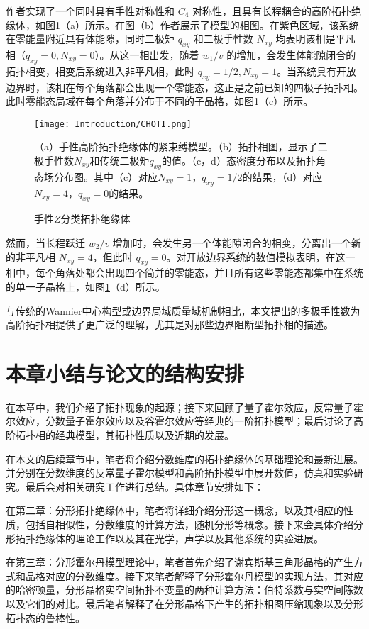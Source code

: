 作者实现了一个同时具有手性对称性和 \( C_4 \) 对称性，且具有长程耦合的高阶拓扑绝缘体，如图\ref{fig:CHOTI}（a）所示。在图（b）作者展示了模型的相图。在紫色区域，该系统在零能量附近具有体能隙，同时二极矩 \( q_{xy} \) 和二极手性数 \( N_{xy} \) 均表明该相是平凡相（\( q_{xy} = 0, N_{xy} = 0 \)）。从这一相出发，随着 \( w_1/v \) 的增加，会发生体能隙闭合的拓扑相变，相变后系统进入非平凡相，此时 \( q_{xy} = 1/2, N_{xy} = 1 \)。当系统具有开放边界时，该相在每个角落都会出现一个零能态，这正是之前已知的四极子拓扑相。此时零能态局域在每个角落并分布于不同的子晶格，如图\ref{fig:CHOTI}（c）所示。

\begin{figure}
    \centering
    \texttt{[image: Introduction/CHOTI.png]}
    \caption{手性$Z$分类拓扑绝缘体}（a）手性高阶拓扑绝缘体的紧束缚模型。（b）拓扑相图，显示了二极手性数$N_{xy}$和传统二极矩$q_{xy}$的值。（c，d）态密度分布以及拓扑角态场分布图。其中（c）对应$N_{xy}=1$，$q_{xy}=1/2$的结果，（d）对应$N_{xy}=4$，$q_{xy}=0$的结果。
    \label{fig:CHOTI}
\end{figure}

然而，当长程跃迁 \( w_2/v \) 增加时，会发生另一个体能隙闭合的相变，分离出一个新的非平凡相 \( N_{xy} = 4 \)，但此时 \( q_{xy} = 0 \)。对开放边界系统的数值模拟表明，在这一相中，每个角落处都会出现四个简并的零能态，并且所有这些零能态都集中在系统的单一子晶格上，如图\ref{fig:CHOTI}（d）所示。

与传统的Wannier中心构型或边界局域质量域机制相比，本文提出的多极手性数为高阶拓扑相提供了更广泛的理解，尤其是对那些边界阻断型拓扑相的描述。

\section{本章小结与论文的结构安排}
在本章中，我们介绍了拓扑现象的起源；接下来回顾了量子霍尔效应，反常量子霍尔效应，分数量子霍尔效应{\color{red}以及谷霍尔效应}等经典的一阶拓扑模型；最后讨论了高阶拓扑相的经典模型，其拓扑性质以及近期的发展。

在本文的后续章节中，笔者将介绍分数维度的拓扑绝缘体的基础理论和最新进展。并分别在分数维度的反常量子霍尔模型和高阶拓扑模型中展开数值，仿真和实验研究。最后会对相关研究工作进行总结。具体章节安排如下：

在第二章：分形拓扑绝缘体中，笔者将详细介绍分形这一概念，以及其相应的性质，包括自相似性，分数维度的计算方法，随机分形等概念。接下来会具体介绍分形拓扑绝缘体的理论工作以及其在光学，声学以及其他系统的实验进展。

在第三章：分形霍尔丹模型理论中，笔者首先介绍了谢宾斯基三角形晶格的产生方式和晶格对应的分数维度。接下来笔者解释了分形霍尔丹模型的实现方法，其对应的哈密顿量，分形晶格实空间拓扑不变量的两种计算方法：伯特系数与实空间陈数以及它们的对比。最后笔者解释了在分形晶格下产生的拓扑相图压缩现象以及分形拓扑态的鲁棒性。

